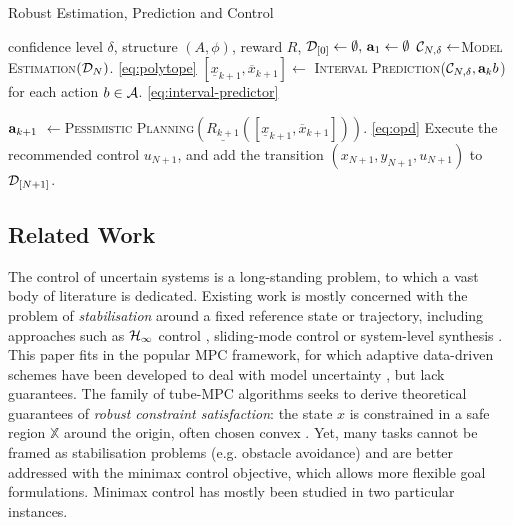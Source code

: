 \documentclass{article}
\begin{document}
\begin{algorithm}[tb]
	\caption{Robust Estimation, Prediction and Control}
	\label{alg:full}
	\begin{algorithmic}
		 confidence level $\delta$, structure $(A,\phi)$, reward $R$, $\mathcal{D}_{[0]}\gets\emptyset,\, \mathbf{a}_1\gets\emptyset$
		\STATE $\mathcal{C}_{N,\delta} \gets$\textsc{Model Estimation}$(\mathcal{D}_{N})$. \eqref{eq:polytope}
		\STATE $[\underline{x}_{k+1}, \overline{x}_{k+1}]\gets$ \textsc{Interval Prediction}($\mathcal{C}_{N,\delta}, \mathbf{a}_kb$) for each action $b\in \mathcal{A}$. \eqref{eq:interval-predictor}

		\STATE $\mathbf{a}_{k+1}$ $\gets$\textsc{Pessimistic Planning}$(\underline{R_{k+1}}([\underline{x}_{k+1}, \overline{x}_{k+1}]))$.  \eqref{eq:opd}
		\ENDFOR
		\STATE Execute the recommended control $u_{N+1}$, and add the transition $(x_{N+1}, y_{N+1}, u_{N+1})$ to $\mathcal{D}_{[N+1]}$.
		\ENDFOR
	\end{algorithmic}
\end{algorithm}

\subsection{Related Work}

The control of uncertain systems is a long-standing problem, to which a vast body of literature is dedicated. Existing work is mostly concerned with the problem of \emph{stabilisation} around a fixed reference state or trajectory, including approaches such as $\mathcal{H}_\infty$ control \citep[][]{Basar1996}, sliding-mode control \citep{Lu1997} or system-level synthesis \citep{Dean2017,Dean2018}. This paper fits in the popular MPC framework, for which adaptive data-driven schemes have been developed to deal with model uncertainty \citep{Sastry1990,Tanaskovic2014,Amos2018}, but lack guarantees. The family of tube-MPC algorithms seeks to derive theoretical guarantees of \emph{robust constraint satisfaction}: the state $x$ is constrained in a safe region $\mathbb{X}$ around the origin, often chosen convex \citep{Fukushima2007,Adetola2009,Aswani2013,Turchetta2016,Lorenzen2017,Kohler2019,Lu2019,Leurent2020robust}.
Yet, many tasks cannot be framed as stabilisation problems (e.g. obstacle avoidance) and are better addressed with the minimax control objective, which allows more flexible goal formulations. Minimax control has mostly been studied in two particular instances.
\end{document}
